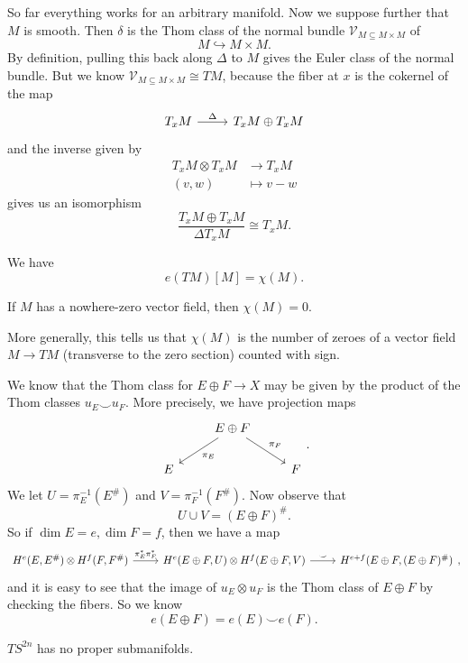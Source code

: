 \documentclass[a4paper]{article}
\begin{document}
So far everything works for an arbitrary manifold. Now we suppose further that $M$ is smooth. Then $\delta$ is the Thom class of the normal bundle $\mathcal{V}_{M \subseteq M \times M}$ of
\[
  M \hookrightarrow M \times M.
\]
By definition, pulling this back along $\Delta$ to $M$ gives the Euler class of the normal bundle. But we know $\mathcal{V}_{M \subseteq M \times M} \cong TM$, because the fiber at $x$ is the cokernel of the map
\[
  \begin{tikzcd}
    T_x M \ar[r, "\Delta"] & T_x M \oplus T_x M
  \end{tikzcd}
\]
and the inverse given by
\begin{align*}
  T_x M \otimes T_x M &\to T_x M\\
  (v, w) &\mapsto v - w
\end{align*}
gives us an isomorphism
\[
  \frac{T_x M \oplus T_x M}{\Delta T_x M} \cong T_x M.
\]
\begin{cor}
  We have
  \[
    e(TM)[M] = \chi(M).
  \]
\end{cor}

\begin{cor}
  If $M$ has a nowhere-zero vector field, then $\chi(M) = 0$.
\end{cor}

More generally, this tells us that $\chi(M)$ is the number of zeroes of a vector field $M \to TM$ (transverse to the zero section) counted with sign.

We know that the Thom class for $E \oplus F \to X$ may be given by the product of the Thom classes $u_E \smile u_F$. More precisely, we have projection maps
\[
  \begin{tikzcd}
    & E \oplus F \ar[dl, "\pi_E"] \ar[rd, "\pi_F"]\\
    E & & F
  \end{tikzcd}.
\]
We let $U = \pi_E^{-1}(E^\#)$ and $V = \pi_F^{-1}(F^\#)$. Now observe that
\[
  U \cup V = (E \oplus F)^\#.
\]
So if $\dim E = e, \dim F = f$, then we have a map
\[
  \begin{tikzcd}
    H^e(E, E^\#) \otimes H^f(F, F^\#) \ar[r, "\pi_E^* \pi_F^*"] & H^e(E \oplus F, U) \otimes H^f(E \oplus F, V) \ar[r, "\smile"] & H^{e + f}(E \oplus F, (E \oplus F)^\#)
  \end{tikzcd},
\]
and it is easy to see that the image of $u_E \otimes u_F$ is the Thom class of $E \oplus F$ by checking the fibers. So we know
\[
  e(E \oplus F) = e(E) \smile e(F).
\]
\begin{cor}
  $TS^{2n}$ has no proper submanifolds.
\end{cor}
\end{document}
